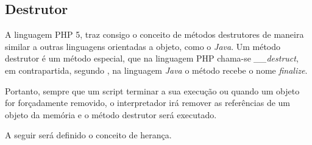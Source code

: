 \subsection{Destrutor}

A linguagem PHP 5, traz consigo o conceito de métodos destrutores de maneira
similar a outras linguagens orientadas a objeto, como o \textit{Java}. Um método
destrutor é um método especial, que na linguagem PHP chama-se
\textit{\_\_destruct}, em contrapartida, segundo , na
linguagem \textit{Java} o método recebe o nome \textit{finalize}.

Portanto, sempre que um script terminar a sua execução ou quando um objeto for
forçadamente removido, o interpretador irá remover as referências de um objeto
da memória e o método destrutor será executado.

A seguir será definido o conceito de herança.